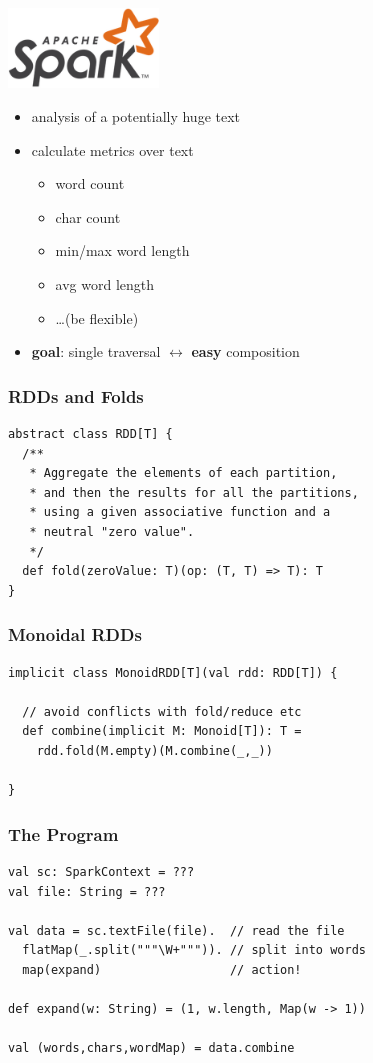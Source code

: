 \documentclass{beamer}
\begin{document}
\begin{frame}
  \begin{center}
    \includegraphics[width=0.3\textwidth]{../images/spark-logo-trademark.png}
  \end{center}

  \begin{itemize}
  \item analysis of a potentially huge text
  \item calculate metrics over text
    \begin{itemize}
    \item word count
    \item char count
    \item min/max word length
    \item avg word length
    \item \dots (be flexible)
    \end{itemize}
  \item \textbf{goal}: single traversal $\leftrightarrow$ \textbf{easy} composition
  \end{itemize}
\end{frame}

\begin{frame}[fragile]
  \frametitle{RDDs and Folds}
\begin{verbatim}
abstract class RDD[T] {
  /**
   * Aggregate the elements of each partition,
   * and then the results for all the partitions,
   * using a given associative function and a
   * neutral "zero value".
   */
  def fold(zeroValue: T)(op: (T, T) => T): T
}
\end{verbatim}
\end{frame}

\begin{frame}[fragile]
  \frametitle{Monoidal RDDs}
\begin{verbatim}
implicit class MonoidRDD[T](val rdd: RDD[T]) {

  // avoid conflicts with fold/reduce etc
  def combine(implicit M: Monoid[T]): T =
    rdd.fold(M.empty)(M.combine(_,_))

}
\end{verbatim}
\end{frame}

\begin{frame}
  \frametitle{The Program}
\begin{verbatim}
val sc: SparkContext = ???
val file: String = ???

val data = sc.textFile(file).  // read the file
  flatMap(_.split("""\W+""")). // split into words
  map(expand)                  // action!

def expand(w: String) = (1, w.length, Map(w -> 1))

val (words,chars,wordMap) = data.combine
\end{verbatim}
\end{frame}
\end{document}
